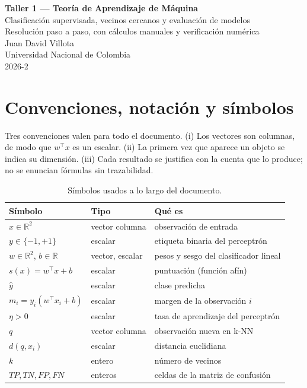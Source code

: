 \documentclass[12pt,a4paper]{article}
\newcommand{\R}{\mathbb{R}}
\begin{document}
\begin{center}
  \vspace*{1.2cm}
  {\Large\bfseries Taller 1 — Teoría de Aprendizaje de Máquina}\\[8pt]
  {\large Clasificación supervisada, vecinos cercanos y evaluación de modelos}\\[6pt]
  {\normalsize Resolución paso a paso, con cálculos manuales y verificación numérica}\\[18pt]
  {\normalsize Juan David Villota}\\[2pt]
  {\small Universidad Nacional de Colombia}\\[2pt]
  {\small 2026-2}
\end{center}

\vspace{0.8cm}
\tableofcontents

\newpage

\section*{Convenciones, notación y símbolos}

Tres convenciones valen para todo el documento. (i) Los vectores son columnas,
de modo que $w^\top x$ es un escalar. (ii) La primera vez que aparece un objeto
se indica su dimensión. (iii) Cada resultado se justifica con la cuenta que lo
produce; no se enuncian fórmulas sin trazabilidad.

\begin{table}[H]
  \centering
  \small
  \caption{Símbolos usados a lo largo del documento.}
  \label{tab:simbolos}
  \begin{tabular}{@{}lll@{}}
    \toprule
    Símbolo & Tipo & Qué es \\
    \midrule
    $x\in\R^2$ & vector columna & observación de entrada \\
    $y\in\{-1,+1\}$ & escalar & etiqueta binaria del perceptrón \\
    $w\in\R^2$, $b\in\R$ & vector, escalar & pesos y sesgo del clasificador lineal \\
    $s(x)=w^\top x+b$ & escalar & puntuación (función afín) \\
    $\hat{y}$ & escalar & clase predicha \\
    $m_i=y_i(w^\top x_i+b)$ & escalar & margen de la observación $i$ \\
    $\eta>0$ & escalar & tasa de aprendizaje del perceptrón \\
    $q$ & vector columna & observación nueva en k-NN \\
    $d(q,x_i)$ & escalar & distancia euclidiana \\
    $k$ & entero & número de vecinos \\
    $TP,TN,FP,FN$ & enteros & celdas de la matriz de confusión \\
    \bottomrule
  \end{tabular}
\end{table}
\end{document}
